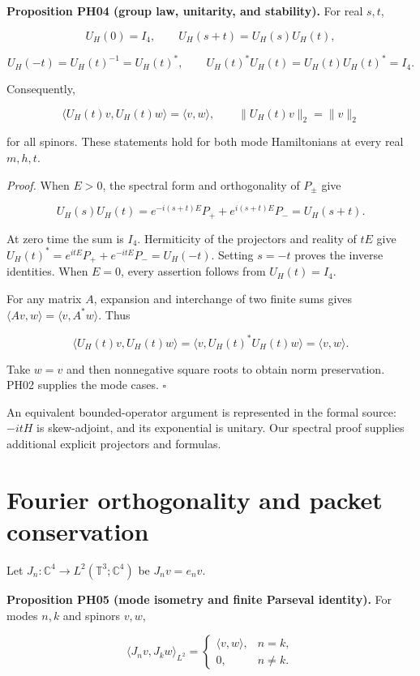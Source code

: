 \textbf{Proposition PH04 (group law, unitarity, and stability).} For
real \(s,t\),

\[
U_H(0)=I_4,\qquad U_H(s+t)=U_H(s)U_H(t),
\]

\[
U_H(-t)=U_H(t)^{-1}=U_H(t)^*,
\qquad U_H(t)^*U_H(t)=U_H(t)U_H(t)^*=I_4.
\]

Consequently,

\[
\langle U_H(t)v,U_H(t)w\rangle=\langle v,w\rangle,\qquad
\|U_H(t)v\|_2=\|v\|_2
\]

for all spinors. These statements hold for both mode Hamiltonians at
every real \(m,h,t\).

\emph{Proof.} When \(E>0\), the spectral form and orthogonality of
\(P_\pm\) give

\[
U_H(s)U_H(t)
=e^{-i(s+t)E}P_++e^{i(s+t)E}P_-=U_H(s+t).
\]

At zero time the sum is \(I_4\). Hermiticity of the projectors and
reality of \(tE\) give \(U_H(t)^*=e^{itE}P_++e^{-itE}P_-=U_H(-t)\).
Setting \(s=-t\) proves the inverse identities. When \(E=0\), every
assertion follows from \(U_H(t)=I_4\).

For any matrix \(A\), expansion and interchange of two finite sums gives
\(\langle Av,w\rangle=\langle v,A^*w\rangle\). Thus

\[
\langle U_H(t)v,U_H(t)w\rangle
=\langle v,U_H(t)^*U_H(t)w\rangle=\langle v,w\rangle.
\]

Take \(w=v\) and then nonnegative square roots to obtain norm
preservation. PH02 supplies the mode cases. \(\square\)

An equivalent bounded-operator argument is represented in the formal source:
\(-itH\) is skew-adjoint, and its exponential is unitary. Our spectral
proof supplies additional explicit projectors and formulas.

\hypertarget{fourier-orthogonality-and-packet-conservation}{%
\section{Fourier orthogonality and packet
conservation}\label{fourier-orthogonality-and-packet-conservation}}

Let \(J_n:\mathbb C^4\to L^2(\mathbb T^3;\mathbb C^4)\) be
\(J_nv=e_nv\).

\textbf{Proposition PH05 (mode isometry and finite Parseval identity).}
For modes \(n,k\) and spinors \(v,w\),

\[
\langle J_nv,J_kw\rangle_{L^2}
=\begin{cases}\langle v,w\rangle,&n=k,\\0,&n\ne k.\end{cases}
\]

